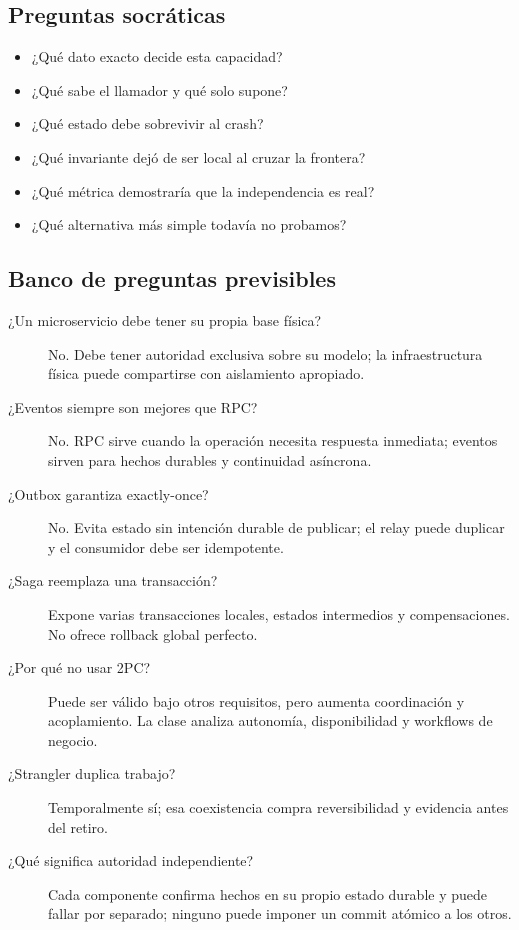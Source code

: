 \documentclass[variant=docente,cover=institutional,mode=screen]{ua-engineering-v6-article}
\begin{document}
\subsection{Preguntas socráticas}
\begin{itemize}
\item ¿Qué dato exacto decide esta capacidad?
\item ¿Qué sabe el llamador y qué solo supone?
\item ¿Qué estado debe sobrevivir al crash?
\item ¿Qué invariante dejó de ser local al cruzar la frontera?
\item ¿Qué métrica demostraría que la independencia es real?
\item ¿Qué alternativa más simple todavía no probamos?
\end{itemize}

\subsection{Banco de preguntas previsibles}
\begin{description}
\item[¿Un microservicio debe tener su propia base física?] No. Debe tener autoridad exclusiva sobre su modelo; la infraestructura física puede compartirse con aislamiento apropiado.
\item[¿Eventos siempre son mejores que RPC?] No. RPC sirve cuando la operación necesita respuesta inmediata; eventos sirven para hechos durables y continuidad asíncrona.
\item[¿Outbox garantiza exactly-once?] No. Evita estado sin intención durable de publicar; el relay puede duplicar y el consumidor debe ser idempotente.
\item[¿Saga reemplaza una transacción?] Expone varias transacciones locales, estados intermedios y compensaciones. No ofrece rollback global perfecto.
\item[¿Por qué no usar 2PC?] Puede ser válido bajo otros requisitos, pero aumenta coordinación y acoplamiento. La clase analiza autonomía, disponibilidad y workflows de negocio.
\item[¿Strangler duplica trabajo?] Temporalmente sí; esa coexistencia compra reversibilidad y evidencia antes del retiro.
\item[¿Qué significa autoridad independiente?] Cada componente confirma hechos en su propio estado durable y puede fallar por separado; ninguno puede imponer un commit atómico a los otros.
\end{description}
\end{document}
